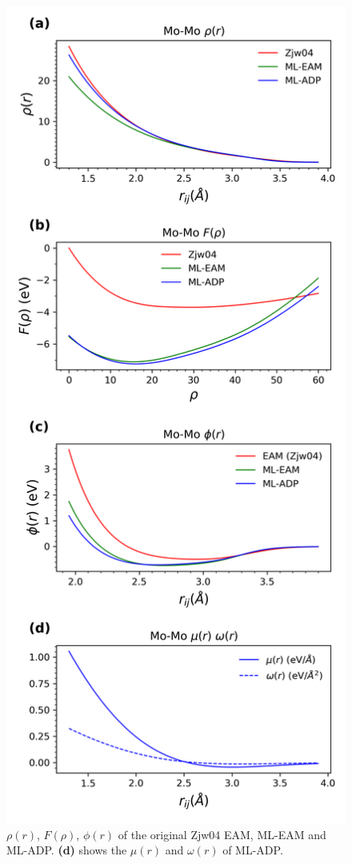 \documentclass[prb,reprint]{revtex4-2}
\begin{document}
% 
%
\begin{figure}[htp]
\centering
\includegraphics[scale=0.6]{figures/Mo_eam_adp.png}
\caption{\label{fig:Mo_eam_adp} $\rho(r)$, $F(\rho)$, $\phi(r)$ of the original 
Zjw04 EAM, ML-EAM and ML-ADP. \textbf{(d)} shows the $\mu(r)$ and $\omega(r)$ of 
ML-ADP.}
\end{figure}
\end{document}
